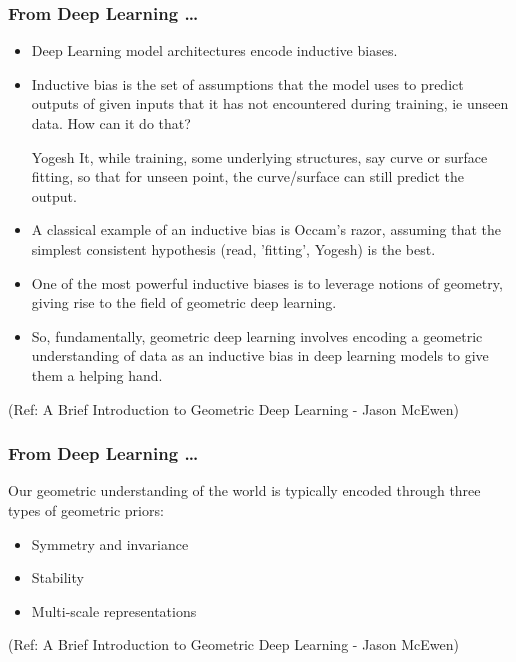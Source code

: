 \begin{frame}[fragile]\frametitle{From Deep Learning \ldots}


\begin{itemize}
\item Deep Learning model architectures encode inductive biases.
\item Inductive bias is the set of assumptions that the model uses to predict outputs of given inputs that it has not encountered during training, ie unseen data. How can it do that? 
\item [Yogesh] It, while training, some underlying structures, say curve or surface fitting, so that for unseen point, the curve/surface can still predict the output.
\item A classical example of an inductive bias is Occam's razor, assuming that the simplest consistent hypothesis (read, 'fitting', Yogesh) is the best.
\item One of the most powerful inductive biases is to leverage notions of geometry, giving rise to the field of geometric deep learning.
\item So, fundamentally, geometric deep learning involves encoding a geometric understanding of data as an inductive bias in deep learning models to give them a helping hand.
\end{itemize}
	  
{\tiny (Ref: A Brief Introduction to Geometric Deep Learning - Jason McEwen)}

\end{frame}

\begin{frame}[fragile]\frametitle{From Deep Learning \ldots}

Our geometric understanding of the world is typically encoded through three types of geometric priors:

	\begin{itemize}
	\item Symmetry and invariance
	\item Stability
	\item Multi-scale representations
	\end{itemize}


{\tiny (Ref: A Brief Introduction to Geometric Deep Learning - Jason McEwen)}

\end{frame}

